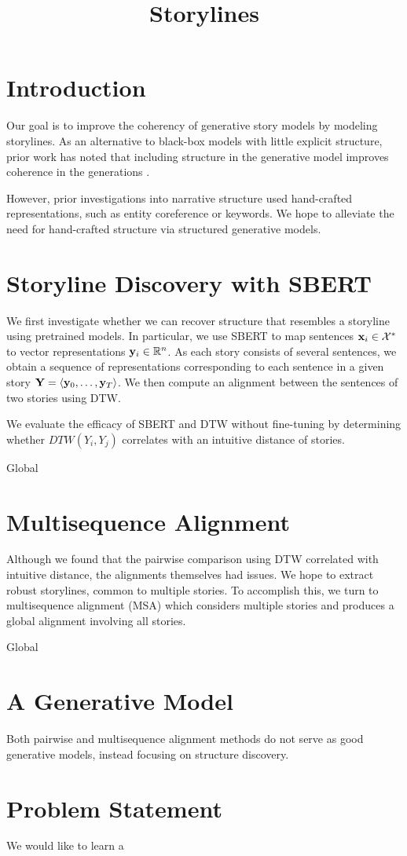 \documentclass{article}
\title{Storylines}
\begin{document}
\maketitle

\section{Introduction}
Our goal is to improve the coherency of generative story models by modeling storylines.
As an alternative to black-box models with little explicit structure,
prior work has noted that including structure in the generative model improves coherence
in the generations \citep{yao2018storyline,fan2019structure}.

However, prior investigations into narrative structure used hand-crafted representations,
such as entity coreference or keywords.
We hope to alleviate the need for hand-crafted structure via structured generative models.

\section{Storyline Discovery with SBERT}
We first investigate whether we can recover structure that resembles a storyline
using pretrained models.
In particular, we use SBERT \citep{reimers2019sbert}
to map sentences $\mathbf{x}_i \in \mathcal{X}^*$ to vector representations $\mathbf{y}_i \in \mathbb{R}^n$.
As each story consists of several sentences, we obtain a sequence of representations
corresponding to each sentence in a given story $\mathbf{Y} = \langle \mathbf{y}_0, \ldots, \mathbf{y}_T \rangle$.
We then compute an alignment between the sentences of two stories using DTW.

We evaluate the efficacy of SBERT and DTW without fine-tuning by determining whether
$DTW(Y_i, Y_j)$ correlates with an intuitive distance of stories.

Global

\section{Multisequence Alignment}
Although we found that the pairwise comparison using DTW correlated with intuitive distance,
the alignments themselves had issues.
We hope to extract robust storylines, common to multiple stories.
To accomplish this, we turn to multisequence alignment (MSA) which
considers multiple stories and produces a global alignment involving
all stories.

Global

\section{A Generative Model}
Both pairwise and multisequence alignment methods do not serve as good generative models,
instead focusing on structure discovery.


\section{Problem Statement}
We would like to learn a 


\newpage


\end{document}
